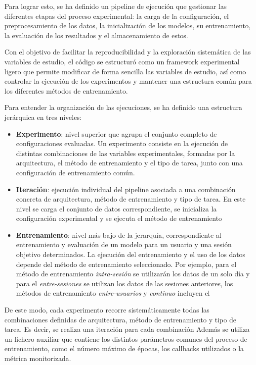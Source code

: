 Para lograr esto, se ha definido un pipeline de ejecución que gestionar las diferentes etapas del proceso experimental: la carga de la configuración, el preprocesamiento de los datos, la inicialización de los modelos, su entrenamiento, la evaluación de los resultados y el almacenamiento de estos.

Con el objetivo de facilitar la reproducibilidad y la exploración sistemática de las variables de estudio, el código se estructuró como un framework experimental ligero que permite modificar de forma sencilla las variables de estudio, así como controlar la ejecución de los experimentos y mantener una estructura común para los diferentes métodos de entrenamiento.

Para entender la organización de las ejecuciones, se ha definido una estructura jerárquica en tres niveles:

\begin{itemize}
    \item \textbf{Experimento}: nivel superior que agrupa el conjunto completo de configuraciones evaluadas. Un experimento consiste en la ejecución de distintas combinaciones de las variables experimentales, formadas por la arquitectura, el método de entrenamiento y el tipo de tarea, junto con una configuración de entrenamiento común.
    \item \textbf{Iteración}: ejecución individual del pipeline asociada a una combinación concreta de arquitectura, método de entrenamiento y tipo de tarea. En este nivel se carga el conjunto de datos correspondiente, se inicializa la configuración experimental y se ejecuta el método de entrenamiento
    \item \textbf{Entrenamiento}: nivel más bajo de la jerarquía, correspondiente al entrenamiento y evaluación de un modelo para un usuario y una sesión objetivo determinados. La ejecución del entrenamiento y el uso de los datos depende del método de entrenamiento seleccionado. Por ejemplo, para el método de entrenamiento \textit{intra-sesión} se utilizarán los datos de un solo día y para el \textit{entre-sesiones} se utilizan los datos de las sesiones anteriores, los métodos de entrenamiento \textit{entre-usuarios} y \textit{continuo} incluyen el

\end{itemize}

De este modo, cada experimento recorre sistemáticamente todas las combinaciones definidas de arquitectura, método de entrenamiento y tipo de tarea. Es decir, se realiza una iteración para cada combinación Además se utiliza un fichero auxiliar que contiene los distintos parámetros comunes del proceso de entrenamiento, como el número máximo de épocas, los callbacks utilizados o la métrica monitorizada.

